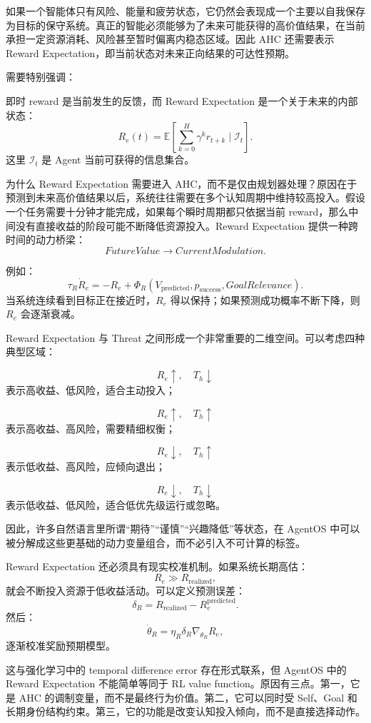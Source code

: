 如果一个智能体只有风险、能量和疲劳状态，它仍然会表现成一个主要以自我保存为目标的保守系统。真正的智能必须能够为了未来可能获得的高价值结果，在当前承担一定资源消耗、风险甚至暂时偏离内稳态区域。因此 AHC 还需要表示 Reward Expectation，即当前状态对未来正向结果的可达性预期。

需要特别强调：
\begin{statementbox}
\centering
{}
\end{statementbox}
即时 reward 是当前发生的反馈，而 Reward Expectation 是一个关于未来的内部状态：
\[
R_e(t)
=
\mathbb E
\left[
\sum_{k=0}^{H}
\gamma^k r_{t+k}
\mid
\mathcal I_t
\right].
\]
这里 \(\mathcal I_t\) 是 Agent 当前可获得的信息集合。

为什么 Reward Expectation 需要进入 AHC，而不是仅由规划器处理？原因在于预测到未来高价值结果以后，系统往往需要在多个认知周期中维持较高投入。假设一个任务需要十分钟才能完成，如果每个瞬时周期都只依据当前 reward，那么中间没有直接收益的阶段可能不断降低资源投入。Reward Expectation 提供一种跨时间的动力桥梁：
\[
FutureValue
\rightarrow
CurrentModulation.
\]

例如：
\[
\tau_R\dot R_e
=
-R_e
+
\Phi_R(
V_{\mathrm{predicted}},
p_{\mathrm{success}},
GoalRelevance
).
\]
当系统连续看到目标正在接近时，\(R_e\) 得以保持；如果预测成功概率不断下降，则 \(R_e\) 会逐渐衰减。

Reward Expectation 与 Threat 之间形成一个非常重要的二维空间。可以考虑四种典型区域：

\[
R_e\uparrow,\quad T_h\downarrow
\]
表示高收益、低风险，适合主动投入；

\[
R_e\uparrow,\quad T_h\uparrow
\]
表示高收益、高风险，需要精细权衡；

\[
R_e\downarrow,\quad T_h\uparrow
\]
表示低收益、高风险，应倾向退出；

\[
R_e\downarrow,\quad T_h\downarrow
\]
表示低收益、低风险，适合低优先级运行或忽略。

因此，许多自然语言里所谓“期待”“谨慎”“兴趣降低”等状态，在 AgentOS 中可以被分解成这些更基础的动力变量组合，而不必引入不可计算的标签。

Reward Expectation 还必须具有现实校准机制。如果系统长期高估：
\[
R_e \gg R_{\mathrm{realized}},
\]
就会不断投入资源于低收益活动。可以定义预测误差：
\[
\delta_R
=
R_{\mathrm{realized}}
-
R_e^{\mathrm{predicted}}.
\]
然后：
\[
\dot{\theta}_R
=
\eta_R\delta_R\nabla_{\theta_R}R_e,
\]
逐渐校准奖励预期模型。

这与强化学习中的 temporal difference error 存在形式联系，但 AgentOS 中的 Reward Expectation 不能简单等同于 RL value function。原因有三点。第一，它是 AHC 的调制变量，而不是最终行为价值。第二，它可以同时受 Self、Goal 和长期身份结构约束。第三，它的功能是改变认知投入倾向，而不是直接选择动作。

